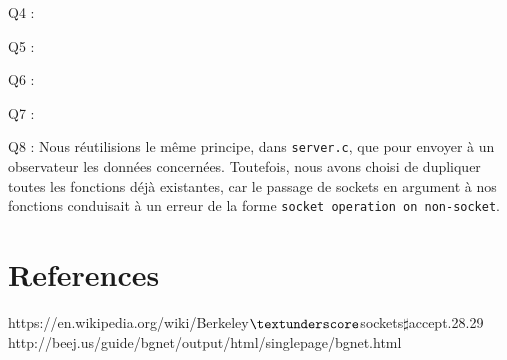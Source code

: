 \documentclass[a4paper]{article}
\begin{document}
Q4 :
\bigskip

Q5 :
\bigskip

Q6 :
\bigskip

Q7 :
\bigskip

Q8 : Nous réutilisions le même principe, dans \texttt{server.c}, que pour envoyer à un observateur les données concernées. Toutefois, nous avons choisi de dupliquer toutes les fonctions déjà existantes, car le passage de sockets en argument à nos fonctions conduisait à un erreur de la forme \texttt{socket operation on non-socket}.
\bigskip

\section{References}
https://en.wikipedia.org/wiki/Berkeley$\textunderscore$sockets$\sharp$accept.28.29
http://beej.us/guide/bgnet/output/html/singlepage/bgnet.html
\end{document}
